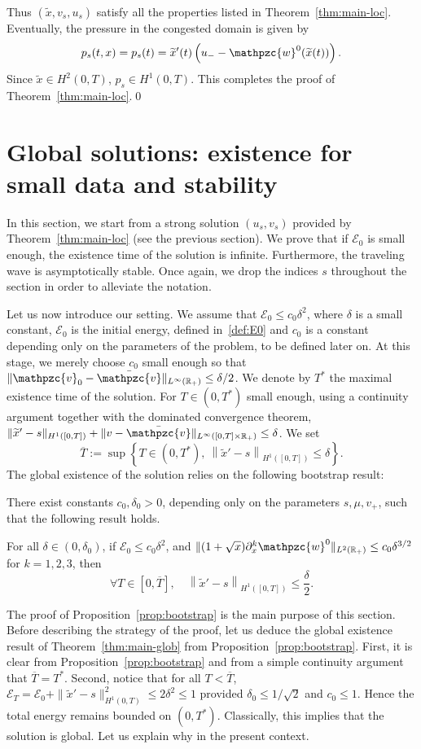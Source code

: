 \documentclass[AHL,Unicode,longabstracts,published]{cedram}
\newcommand{\R}{\mathbb{R}}
\newcommand{\p}{\partial}
\newcommand{\bv}{\bar{\mathpzc{v}}}
\newcommand{\cE}{\mathcal E}
\newcommand{\tv}{\mathpzc{v}}
\newcommand{\tw}{\mathpzc{w}}
\newcommand{\tx}{\widetilde{x}}
\let\oldforall\forall
\renewcommand*{\forall}{\mathrel{\oldforall}}
\newcommand{\tx}{\widetilde{x}}
\begin{document}
Thus $(\tx, v_s, u_s) $ satisfy all the properties listed in Theorem~\ref{thm:main-loc}. Eventually, the pressure in the congested domain is given by
\[
p_s(t,x)=p_s(t)=\tx'(t) \left(u_- - \tw^0(\tx(t))\right).
\]
Since $\tx\in H^2(0,T)$, $p_s\in H^1(0,T)$. This completes the proof of Theorem~\ref{thm:main-loc}.\qed


\section{Global solutions: existence for small data and stability} \label{sec:global}

In this section, we start from a strong solution $(u_s,v_s)$ provided by Theorem~\ref{thm:main-loc} (see the previous section). We prove that if $\cE_0$ is small enough, the existence time of the solution is infinite. Furthermore, the traveling wave is asymptotically stable. Once again, we drop the indices $s$ throughout the section in order to alleviate the notation.

Let us now introduce our setting. We assume that $\cE_0\leq c_0\delta^2$, where $\delta$ is a small constant, $\cE_0$ is the initial energy, defined in~\eqref{def:E0} and $c_0$ is a constant depending only on the parameters of the problem, to be defined later on. At this stage, we merely choose $c_0$ small enough so that $\|\tv_0-\bv\|_{L^\infty(\R_+)}\leq \delta/2$. We denote by $T^*$ the maximal existence time of the solution. For $T\in (0, T^*)$ small enough, using a continuity argument together with the dominated convergence theorem, $\| \tx'-s\|_{H^1([0,T])} + \|v -\bv\|_{L^\infty([0,T] \times \R_+)} \leq \delta$. We set
\[
\overline{T}:=\sup\left\{T\in (0, T^*), \ \left\|\tx'-s\right\|_{H^1([0,T])}\leq \delta\right\}.
\]
The global existence of the solution relies on the following bootstrap result:
\begin{prop}\label{prop:bootstrap}
There exist constants $c_0,\delta_0>0$, depending only on the parameters $s,\mu, v_+$, such that the following result holds.

For all $\delta\in (0, \delta_0)$, if $\cE_0\leq c_0\delta^2$, and $\|(1+\sqrt{x}) \p_x^k \tw^0\|_{L^2(\R_+)} \leq c_0 \delta^{3/2}$ for $k=1,2,3$, then
\[
\forall T\in [0, \overline{T}],\quad \left\|\tx'-s\right\|_{H^1([0,T])}\leq\frac{\delta}{2}.
\]
\end{prop}

The proof of Proposition~\ref{prop:bootstrap} is the main purpose of this section. Before describing the strategy of the proof, let us deduce the global existence result of Theorem~\ref{thm:main-glob} from Proposition~\ref{prop:bootstrap}. First, it is clear from Proposition~\ref{prop:bootstrap} and from a simple continuity argument that $\overline{T}=T^*$. Second, notice that for all $T< \overline{T}$, $\cE_T=\cE_0 + \|\tx'-s\|_{H^1(0,T)}^2 \leq 2 \delta^2 \leq 1$ provided $\delta_0\leq 1/\sqrt{2}$ and $c_0\leq 1$. Hence the total energy remains bounded on $(0, T^*)$. Classically, this implies that the solution is global. Let us explain why in the present context.
\end{document}
